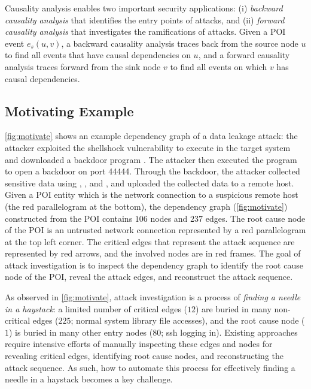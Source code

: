 Causality analysis enables two important security applications:
(i) \emph{backward causality analysis} that identifies the entry points of attacks, and (ii) \emph{forward causality analysis} that investigates the ramifications of attacks.
Given a POI event $e_s(u,v)$, a backward causality analysis traces back from the source node $u$ to find all events that have causal dependencies on $u$,
and a forward causality analysis traces forward from the sink node $v$ to find all events on which $v$ has causal dependencies.






\subsection{Motivating Example}
\label{subsec:motivating-example}

\cref{fig:motivate} shows an example dependency graph of a 
data leakage attack:
the attacker exploited the shellshock vulnerability to execute  in the target system and downloaded a backdoor program . The attacker then executed the  program to open a backdoor on port 44444. Through the backdoor, the attacker collected sensitive data using , , and , and uploaded the collected data to a remote host.
%
Given a POI entity which is the network connection to a suspicious remote host (\ie the red parallelogram at the bottom), the dependency graph (\cref{fig:motivate}) constructed from the POI 
contains $106$ nodes and $237$ edges.
The root cause node of the POI is an untrusted network connection represented by a red parallelogram at the top left corner.
The critical edges that represent the attack sequence are represented by red arrows, and the involved nodes are in red frames.
%
The goal of attack investigation is to inspect the dependency graph to identify the root cause node of the POI, reveal the attack edges, and reconstruct the attack sequence.


As observed in \cref{fig:motivate}, attack investigation is a process of \emph{finding a needle in a haystack}: 
a limited number of critical edges (\ie $12$) are buried in many non-critical edges (\ie $225$; \eg normal system library file accesses),
and the root cause node (\ie $1$) is buried in many other entry nodes (\ie $80$;
\eg ssh logging in).
Existing approaches~\cite{backtracking,backtracking2,taser,intrusionrecovery,liu2018priotracker} require intensive efforts of manually inspecting these edges and nodes for revealing critical edges, identifying root cause nodes, and reconstructing the attack sequence.
As such, how to automate this process for effectively finding a needle in a haystack becomes a key challenge.




